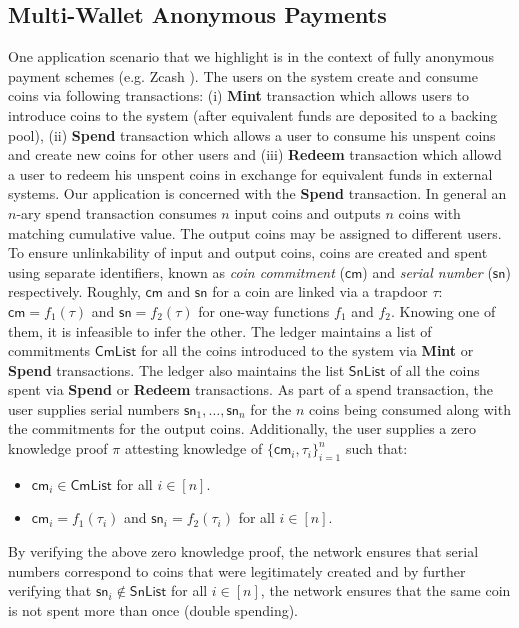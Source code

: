 \subsection{Multi-Wallet Anonymous Payments}
One application scenario that we highlight is in the context of fully anonymous payment schemes (e.g. Zcash \cite{zerocash}). The users on the system
create and consume coins via following transactions: (i) {\bf Mint} transaction which allows users to introduce coins to the system (after equivalent funds are
deposited to a backing pool), (ii) {\bf Spend} transaction which allows a user to consume his unspent coins and create new coins for other users and 
(iii) {\bf Redeem} transaction which allowd a user to redeem his unspent coins in exchange for equivalent funds in external systems. Our application 
is concerned with the {\bf Spend} transaction. In general an $n$-ary spend transaction consumes $n$ input coins and outputs $n$ coins with matching 
cumulative value. The output coins may be assigned to different users. To ensure unlinkability of input and output coins, coins are created
and spent using separate identifiers, known as {\em coin commitment} ($\mathsf{cm}$) and {\em serial number} ($\mathsf{sn}$) respectively. 
Roughly, $\mathsf{cm}$
and $\mathsf{sn}$ for a coin are linked via a trapdoor $\tau$: $\mathsf{cm} = f_1(\tau)$ and $\mathsf{sn}=f_2(\tau)$ for one-way functions
$f_1$ and $f_2$. Knowing one of them, it is infeasible to infer the other.  
The ledger maintains a list of commitments $\mathsf{CmList}$ for all the coins introduced to the system via {\bf Mint} or {\bf Spend} transactions. 
The ledger also maintains the list $\mathsf{SnList}$ of all the coins spent via {\bf Spend} or {\bf Redeem} transactions. As part of a spend transaction, 
the user supplies serial numbers $\mathsf{sn}_1,\ldots,\mathsf{sn}_n$ for the $n$ coins being consumed along with the commitments for the output coins.
 Additionally, the 
user supplies a zero knowledge proof $\pi$ attesting knowledge of $\{\mathsf{cm}_i,\tau_i\}_{i=1}^n$ such that:
\begin{itemize}
    \item $\mathsf{cm}_i\in \mathsf{CmList}$ for all $i\in [n]$.
    \item $\mathsf{cm}_i=f_1(\tau_i)$ and $\mathsf{sn}_i=f_2(\tau_i)$ for all $i\in [n]$.
\end{itemize}
By verifying the above zero knowledge proof, the network ensures that serial numbers correspond to coins that were legitimately created and by further
verifying that $\mathsf{sn}_i\not\in \mathsf{SnList}$ for all $i\in [n]$, the network ensures that the same coin is not 
spent more than once (double spending).

